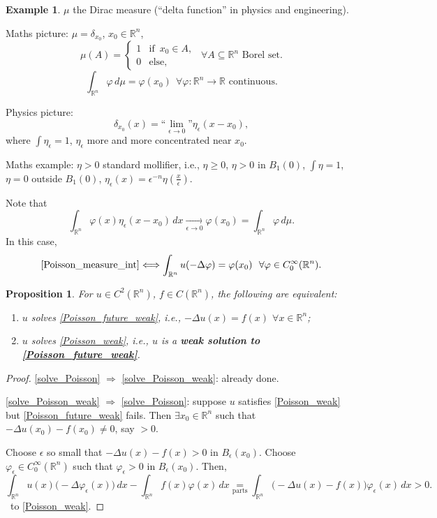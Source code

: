 \documentclass[12pt]{article}
\newtheorem{proposition}{Proposition}[section]
\theoremstyle{definition}
\newtheorem{example}{Example}
\begin{document}
\begin{example}
$\mu$ the Dirac measure (``delta function'' in physics and engineering).

Maths picture: $\mu=\delta_{x_0}$, $x_0\in\mathbb R^n$,
\[\mu(A)=\left\{\begin{array}{ll}1&\text{if }\,x_0\in A,\\0&\text{else},\end{array}\right.\ \ \forall A\subseteq\mathbb R^n\text{ Borel set}.\]
\[\int_{\mathbb R^n}\varphi\,d\mu=\varphi(x_0)\ \ \forall\varphi:\mathbb R^n\rightarrow\mathbb R\text{ continuous}.\]

Physics picture:
\[\delta_{x_0}(x)=\text{``}\lim_{\epsilon\to0}\text{''}\eta_\epsilon(x-x_0),\]
where $\int\eta_\epsilon=1$, $\eta_\epsilon$ more and more concentrated near $x_0$.

Maths example: $\eta>0$ standard mollifier, i.e., $\eta\geq0$, $\eta>0$ in $B_1(0)$, $\int\eta=1$, $\eta=0$ outside $B_1(0)$, $\eta_\epsilon(x)=\epsilon^{-n}\eta(\frac x\epsilon)$.

Note that
\[\int_{\mathbb R^n}\varphi(x)\eta_\epsilon(x-x_0)\,dx\xrightarrow[\epsilon\to0]{}\varphi(x_0)=\int_{\mathbb R^n}\varphi\,d\mu.\]
In this case,
\[\text{\eqref{Poisson_measure_int}}\Longleftrightarrow\int_{\mathbb R^n}u(-\Delta\varphi)=\varphi(x_0)\ \ \forall\varphi\in C_0^\infty(\mathbb R^n).\]
\end{example}

\begin{proposition}\label{Poisson_iff_weak}
For $u\in C^2(\mathbb R^n)$, $f\in C(\mathbb R^n)$, the following are equivalent:
\begin{enumerate}[label=(\roman*)]
\item\label{solve_Poisson} $u$ solves \eqref{Poisson_future_weak}, i.e., $-\Delta u(x)=f(x)$ $\forall x\in\mathbb R^n$;
\item\label{solve_Poisson_weak} $u$ solves \eqref{Poisson_weak}, i.e., $u$ is a \textbf{weak solution to \eqref{Poisson_future_weak}}.
\end{enumerate}
\end{proposition}

\begin{proof}
\ref{solve_Poisson} $\Rightarrow$ \ref{solve_Poisson_weak}: already done.

\ref{solve_Poisson_weak} $\Rightarrow$ \ref{solve_Poisson}: suppose $u$ satisfies \eqref{Poisson_weak} but \eqref{Poisson_future_weak} fails. Then $\exists x_0\in\mathbb R^n$ such that $-\Delta u(x_0)-f(x_0)\neq0$, say $>0$.

Choose $\epsilon$ so small that $-\Delta u(x)-f(x)>0$ in $B_\epsilon(x_0)$. Choose $\varphi_\epsilon\in C_0^\infty(\mathbb R^n)$ such that $\varphi_\epsilon>0$ in $B_\epsilon(x_0)$. Then,
\[\int_{\mathbb R^n}u(x)\big(-\Delta\varphi_\epsilon(x)\big)\,dx-\int_{\mathbb R^n}f(x)\varphi(x)\,dx\underset{\text{parts}}=\int_{\mathbb R^n}\big(-\Delta u(x)-f(x)\big)\varphi_\epsilon(x)\,dx>0.\]
\Lightning\  to \eqref{Poisson_weak}.
\end{proof}
\end{document}
